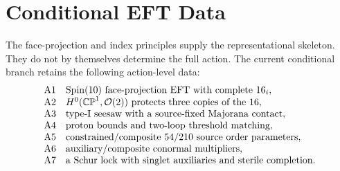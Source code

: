 \documentclass[
  aps,
  prd,
  preprint,
  nofootinbib,
  superscriptaddress,
  longbibliography
]{revtex4-2}
\newcommand{\Spin}{\mathrm{Spin}}
\newcommand{\CP}{\mathbb{CP}}
\newcommand{\cO}{\mathcal{O}}
\begin{document}
\FloatBarrier

\section{Conditional EFT Data}

The face-projection and index principles supply the representational skeleton.
They do not by themselves determine the full action.  The current conditional
branch retains the following action-level data:
\[
\begin{array}{ll}
{\rm A1} & \Spin(10)\text{ face-projection EFT with complete }16_i,\\
{\rm A2} & H^0(\CP^1,\cO(2))\text{ protects three copies of the }16,\\
{\rm A3} & \text{type-I seesaw with a source-fixed Majorana contact},\\
{\rm A4} & \text{proton bounds and two-loop threshold matching},\\
{\rm A5} & \text{constrained/composite }54/210\text{ source order parameters},\\
{\rm A6} & \text{auxiliary/composite conormal multipliers},\\
{\rm A7} & \text{a Schur lock with singlet auxiliaries and sterile completion}.
\end{array}
\]
\end{document}
